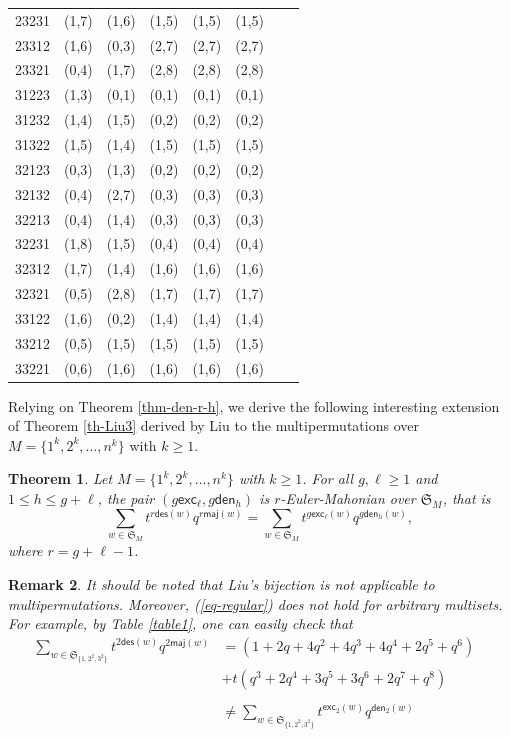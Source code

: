 \documentclass[12pt]{article}
\numberwithin{equation}{section}
\theoremstyle{plain}
\newtheorem{theorem}{Theorem}[section]
\newtheorem{remark}[theorem]{Remark}
\def\des{\mathsf{des}}
\def\maj{\mathsf{maj}}
\def\exc{\mathsf{exc}}
\def\den{\mathsf{den}}
\begin{document}
\begin{table}[htb]
\begin{center}
\begin{tabular}{cccccccc}
			23231 &	(1,7) & (1,6) &	(1,5) & (1,5) & (1,5)\\
			23312 &	(1,6) & (0,3) &	(2,7) & (2,7) & (2,7)\\
			23321 &	(0,4) & (1,7) &	(2,8) & (2,8) & (2,8)\\
			31223 &	(1,3) & (0,1) &	(0,1) & (0,1) & (0,1)\\
			31232 &	(1,4) & (1,5) &	(0,2) & (0,2) & (0,2)\\
			31322 & (1,5) & (1,4) & (1,5) & (1,5) & (1,5)\\
			32123 & (0,3) & (1,3) & (0,2) & (0,2) & (0,2)\\
			32132 & (0,4) & (2,7) & (0,3) & (0,3) & (0,3)\\
			32213 & (0,4) & (1,4) & (0,3) & (0,3) & (0,3)\\
			32231 & (1,8) & (1,5) & (0,4) & (0,4) & (0,4)\\
			32312 & (1,7) & (1,4) & (1,6) & (1,6) & (1,6)\\
			32321 & (0,5) & (2,8) & (1,7) & (1,7) & (1,7)\\
			33122 & (1,6) & (0,2) & (1,4) & (1,4) & (1,4)\\
			33212 & (0,5) & (1,5) & (1,5) & (1,5) & (1,5)\\
			33221 & (0,6) & (1,6) & (1,6) & (1,6) & (1,6)\\
			\bottomrule
		\end{tabular}
	\end{center}
\end{table}

 	
Relying on Theorem \ref{thm-den-r-h}, we derive 
  the following interesting extension of Theorem \ref{th-Liu3} derived by Liu \cite{Liu3} to the multipermutations over $M=\{1^k, 2^k, \ldots, n^k\}$ with $k\geq 1$. 
	\begin{theorem}\label{th-regular}
		Let $M=\{1^{k}, 2^{k}, \ldots, n^{k}\}$ with $k\geq 1$. 
		For all $g, \ell\geq 1$ and $1\leq h\leq g+\ell$,  the pair  $(g\exc_\ell, g\den_{h})$ is $r$-Euler-Mahonian over $\mathfrak{S}_M$, that is 
		\begin{equation}\label{eq-regular}
		\sum_{w\in \mathfrak{S}_{M}}t^{r\des(w)}q^{r\maj(w)}=	\sum_{w\in \mathfrak{S}_{M}}t^{g\exc_\ell(w)}q^{g\den_{h}(w)},
			\end{equation} 
		where $r=g+\ell-1$.  
	\end{theorem}
\begin{remark}
 It should be noted  that Liu's bijection \cite{Liu3}  is not applicable to  multipermutations. 
  Moreover, (\ref{eq-regular})  does not hold for  arbitrary multisets.   For example, by Table \ref{table1}, one can easily check that 
   $$
  \begin{array}{lll}
  	\sum\limits_{w\in \mathfrak{S}_{\{{1,2^2,3^2}\}}}  t^{2\des(w)}q^{2\maj(w)}
  	&=(1+2q+4q^2+4q^3+4q^4+2q^5+q^6)\\
  	&+t(q^3+2q^4+3q^5+3q^6+2q^7+q^8)\\
  	&&\\
  	&\neq \sum\limits_{w\in \mathfrak{S}_{\{{1,2^2,3^2}\}}}  t^{\exc_2(w)}q^{\den_2(w)} 
  \end{array}
  $$
\end{remark}
	
\end{document}
